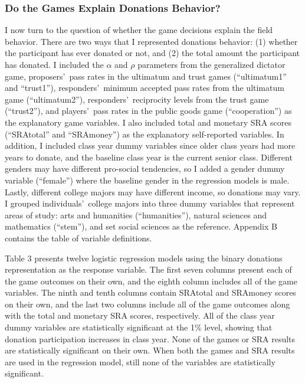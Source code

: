 \documentclass[12pt]{article}
\begin{document}
\subsubsection{Do the Games Explain Donations Behavior?}
I now turn to the question of whether the game decisions explain the field behavior. There are two ways that I represented donations behavior: (1) whether the participant has ever donated or not, and (2) the total amount the participant has donated. I included the \(\alpha\) and \(\rho\) parameters from the generalized dictator game, proposers\rq \ pass rates in the ultimatum and trust games (``ultimatum1'' and ``trust1''), responders\rq \ minimum accepted pass rates from the ultimatum game (``ultimatum2''), responders\rq \ reciprocity levels from the trust game (``trust2''), and players\rq \ pass rates in the public goods game (``cooperation'') as the explanatory game variables. I also included total and monetary SRA scores (``SRAtotal'' and ``SRAmoney'') as the explanatory self-reported variables. In addition, I included class year dummy variables since older class years had more years to donate, and the baseline class year is the current senior class. Different genders may have different pro-social tendencies, so I added a gender dummy variable (``female'') where the baseline gender in the regression models is male. Lastly, different college majors may have different income, so donations may vary. I grouped individuals\rq \ college majors into three dummy variables that represent areas of study: arts and humanities (``humanities''), natural sciences and mathematics (``stem''), and set social sciences as the reference. Appendix B contains the table of variable definitions. 

Table 3 presents twelve logistic regression models using the binary donations representation as the response variable. The first seven columns present each of the game outcomes on their own, and the eighth column includes all of the game variables. The ninth and tenth columns contain SRAtotal and SRAmoney scores on their own, and the last two columns include all of the game outcomes along with the total and monetary SRA scores, respectively. All of the class year dummy variables are statistically significant at the 1\% level, showing that donation participation increases in class year. None of the games or SRA results are statistically significant on their own. When both the games and SRA results are used in the regression model, still none of the variables are statistically significant. 
\end{document}
